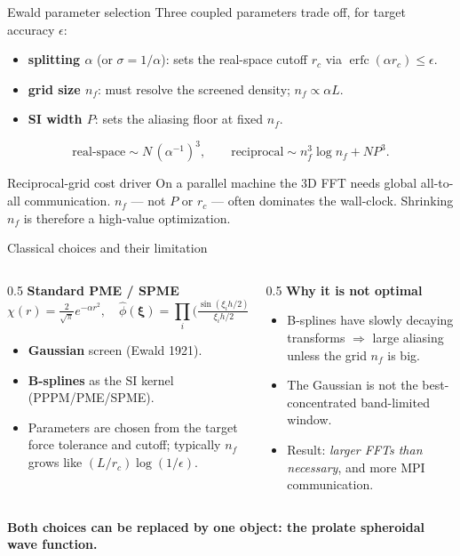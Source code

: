 \documentclass[aspectratio=169,11pt]{beamer}
\newcommand{\hl}[1]{{\color{CCMorange}\textbf{#1}}}
\DeclareMathOperator{\erfc}{erfc}
\begin{document}
\begin{frame}{Ewald parameter selection}
\small
Three coupled parameters trade off, for target accuracy \(\epsilon\):
\begin{itemize}\itemsep2pt
  \item \hl{splitting \(\alpha\)} (or \(\sigma=1/\alpha\)): sets the real-space cutoff \(r_c\) via \(\erfc(\alpha r_c)\le\epsilon\).
  \item \hl{grid size \(n_f\)}: must resolve the screened density; \(n_f\propto \alpha L\).
  \item \hl{SI width \(P\)}: sets the aliasing floor at fixed \(n_f\).
\end{itemize}
\[
  \text{real-space} \sim N\,(\alpha^{-1})^3,\qquad \text{reciprocal} \sim n_f^3\log n_f + N P^3 .
\]
\begin{block}{Reciprocal-grid cost driver}
On a parallel machine the 3D FFT needs global all-to-all communication. \(n_f\) --- not \(P\) or \(r_c\) --- often dominates the wall-clock. Shrinking \(n_f\) is therefore a high-value optimization.
\end{block}
\end{frame}

\begin{frame}{Classical choices and their limitation}
\small
\begin{columns}[T,totalwidth=\textwidth]
\begin{column}{0.5\textwidth}
\textbf{Standard PME / SPME}
\[
  \chi(r)=\tfrac{2}{\sqrt\pi}e^{-\alpha r^2},\quad
  \widehat\phi(\bm\xi)=\prod_{i}\Big(\tfrac{\sin(\xi_i h/2)}{\xi_i h/2}\Big)^{P}.
\]
\begin{itemize}\itemsep2pt
  \item \hl{Gaussian} screen (Ewald 1921).
  \item \hl{B-splines} as the SI kernel (PPPM/PME/SPME).
  \item Parameters are chosen from the target force tolerance and cutoff;
  typically \(n_f\) grows like \((L/r_c)\log(1/\epsilon)\).
\end{itemize}
\end{column}
\begin{column}{0.5\textwidth}
\textbf{Why it is not optimal}
\begin{itemize}\itemsep3pt
  \item B-splines have slowly decaying transforms \(\Rightarrow\) large aliasing unless the grid \(n_f\) is big.
  \item The Gaussian is not the best-concentrated band-limited window.
  \item Result: \emph{larger FFTs than necessary}, and more MPI communication.
\end{itemize}
\end{column}
\end{columns}
\vspace{2mm}
\centerline{\hl{Both choices can be replaced by one object: the prolate spheroidal wave function.}}
\end{frame}
\end{document}
